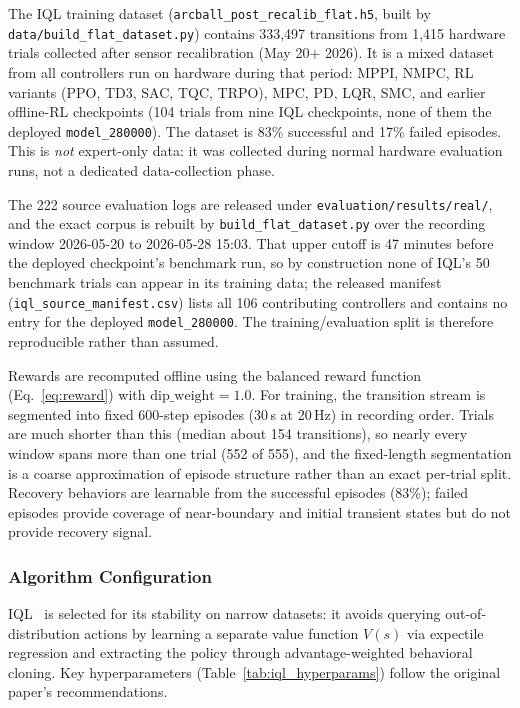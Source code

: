 The IQL training dataset (\texttt{arcball\_post\_recalib\_flat.h5},
built by \texttt{data/build\_flat\_dataset.py}) contains
333,497 transitions from 1,415 hardware trials collected after sensor
recalibration (May 20+ 2026). It is a mixed dataset from all
controllers run on hardware during that period: MPPI, NMPC, RL variants
(PPO, TD3, SAC, TQC, TRPO), MPC, PD, LQR, SMC, and earlier offline-RL
checkpoints (104 trials from nine IQL checkpoints, none of them the
deployed \texttt{model\_280000}).
The dataset is 83\% successful and 17\% failed episodes.
This is \emph{not} expert-only data: it was collected during normal
hardware evaluation runs, not a dedicated data-collection phase.

The 222 source evaluation logs are released under
\texttt{evaluation/results/real/}, and the exact corpus is rebuilt by
\texttt{build\_flat\_dataset.py} over the recording window
2026-05-20 to 2026-05-28 15:03. That upper cutoff is 47 minutes before the
deployed checkpoint's benchmark run, so by construction none of IQL's 50
benchmark trials can appear in its training data; the released manifest
(\texttt{iql\_source\_manifest.csv}) lists all 106 contributing
controllers and contains no entry for the deployed \texttt{model\_280000}.
The training/evaluation split is therefore reproducible rather than assumed.

Rewards are recomputed offline using the balanced reward function
(Eq.~\ref{eq:reward}) with $\text{dip\_weight} = 1.0$. For training, the
transition stream is segmented into fixed 600-step episodes (30\,s at
20\,Hz) in recording order. Trials are much shorter than this (median
about 154 transitions), so nearly every window spans more than one trial
(552 of 555), and the fixed-length segmentation is a coarse approximation
of episode structure rather than an exact per-trial split.
Recovery behaviors are learnable from the successful episodes (83\%);
failed episodes provide coverage of near-boundary and initial transient
states but do not provide recovery signal.

\subsubsection{Algorithm Configuration}

IQL~\cite{kostrikov2022iql} is selected for its stability on
narrow datasets: it avoids querying out-of-distribution actions
by learning a separate value function $V(s)$ via expectile
regression and extracting the policy through advantage-weighted
behavioral cloning.
Key hyperparameters (Table~\ref{tab:iql_hyperparams}) follow the
original paper's recommendations.

